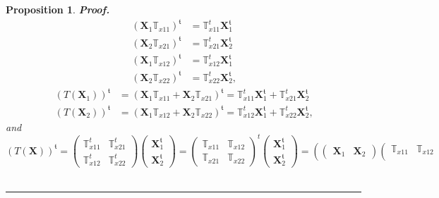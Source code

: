 \documentclass[aps, preprint]{revtex4}
\newtheorem{proposition}[theorem]{Proposition}
\newenvironment{proof}[1][Proof]{\noindent\textbf{#1.} }{\ \rule{0.5em}{0.5em}}
\begin{document}
\begin{proposition}
\begin{proof}
\begin{align}\left (\mathbf{X}_{1} \mathbb{T}_{x 1 1}\right )^{\mathfrak{t}} &  =\mathbb{T}_{x 1 1}^{t} \mathbf{X}_{1}^{\mathfrak{t}} \\
\left (\mathbf{X}_{2} \mathbb{T}_{x 2 1}\right )^{\mathfrak{t}} &  =\mathbb{T}_{x 2 1}^{t} \mathbf{X}_{2}^{\mathfrak{t}} \\
\left (\mathbf{X}_{1} \mathbb{T}_{x 1 2}\right )^{\mathfrak{t}} &  =\mathbb{T}_{x 1 2}^{t} \mathbf{X}_{1}^{\mathfrak{t}} \\
\left (\mathbf{X}_{2} \mathbb{T}_{x 2 2}\right )^{\mathfrak{t}} &  =\mathbb{T}_{x 2 2}^{t} \mathbf{X}_{2}^{\mathfrak{t}}\text{,}\end{align}
\begin{align}\left (T \left (\mathbf{X}_{1}\right )\right )^{\mathfrak{t}} &  =\left (\mathbf{X}_{1} \mathbb{T}_{x 1 1} +\mathbf{X}_{2} \mathbb{T}_{x 2 1}\right )^{\mathfrak{t}} =\mathbb{T}_{x 1 1}^{t} \mathbf{X}_{1}^{\mathfrak{t}} +\mathbb{T}_{x 2 1}^{t} \mathbf{X}_{2}^{\mathfrak{t}} \\
\left (T \left (\mathbf{X}_{2}\right )\right )^{\mathfrak{t}} &  =\left (\mathbf{X}_{1} \mathbb{T}_{x 1 2} +\mathbf{X}_{2} \mathbb{T}_{x 2 2}\right )^{\mathfrak{t}} =\mathbb{T}_{x 1 2}^{t} \mathbf{X}_{1}^{\mathfrak{t}} +\mathbb{T}_{x 2 2}^{t} \mathbf{X}_{2}^{\mathfrak{t}}\text{,}\end{align}and
\begin{equation}\left (T \left (\mathbf{X}\right )\right )^{\mathfrak{t}} =\left (\begin{array}{cc}\mathbb{T}_{x 1 1}^{t} & \mathbb{T}_{x 2 1}^{t} \\
\mathbb{T}_{x 1 2}^{t} & \mathbb{T}_{x 2 2}^{t}\end{array}\right ) \left (\begin{array}{c}\mathbf{X}_{1}^{\mathfrak{t}} \\
\mathbf{X}_{2}^{\mathfrak{t}}\end{array}\right ) =\left (\begin{array}{cc}\mathbb{T}_{x 1 1} & \mathbb{T}_{x 1 2} \\
\mathbb{T}_{x 2 1} & \mathbb{T}_{x 2 2}\end{array}\right )^{t} \left (\begin{array}{c}\mathbf{X}_{1}^{\mathfrak{t}} \\
\mathbf{X}_{2}^{\mathfrak{t}}\end{array}\right ) =\left (\left (\begin{array}{cc}\mathbf{X}_{1} & \mathbf{X}_{2}\end{array}\right ) \left (\begin{array}{cc}\mathbb{T}_{x 1 1} & \mathbb{T}_{x 1 2} \\

\end{array}
\end{equation}
\end{proof}
\end{proposition}
\end{document}
